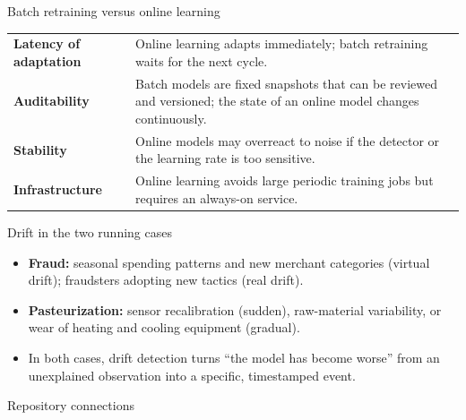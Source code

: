 \begin{frame}{Batch retraining versus online learning}
\begin{tabularx}{\textwidth}{>{\bfseries}l X}
Latency of adaptation & Online learning adapts immediately; batch retraining waits for the next cycle. \\
\addlinespace[0.3em]
Auditability & Batch models are fixed snapshots that can be reviewed and versioned; the state of an online model changes continuously. \\
\addlinespace[0.3em]
Stability & Online models may overreact to noise if the detector or the learning rate is too sensitive. \\
\addlinespace[0.3em]
Infrastructure & Online learning avoids large periodic training jobs but requires an always-on service. \\
\bottomrule
\end{tabularx}
\coursefooter
\end{frame}

\begin{frame}{Drift in the two running cases}
\begin{itemize}
\item \textbf{Fraud:} seasonal spending patterns and new merchant categories (virtual drift); fraudsters adopting new tactics (real drift).
\item \textbf{Pasteurization:} sensor recalibration (sudden), raw-material variability, or wear of heating and cooling equipment (gradual).
\item In both cases, drift detection turns ``the model has become worse'' from an unexplained observation into a specific, timestamped event.
\end{itemize}
\coursefooter
\end{frame}

\begin{frame}{Repository connections}
\coursefooter
\end{frame}

